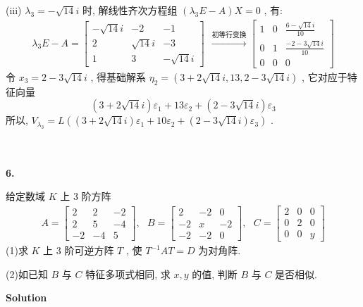 \documentclass[11pt,a4paper,openany,oneside]{book}
\newcommand\Solution{\noindent\textbf{\textsf{Solution}}\par\medskip}
\begin{document}
(iii) $ \lambda_3=-\sqrt{14}i $ 时, 解线性齐次方程组 $ (\lambda_3E -A)X=0 $ , 有:
\begin{gather*}
\lambda_3E-A=
\begin{bmatrix}
-\sqrt{14}i  &  -2  &  -1  \\
2  &  \sqrt{14}i  &  -3  \\
1  &  3  &  -\sqrt{14}i
\end{bmatrix} \ \ \xrightarrow{初等行变换}
\begin{bmatrix}
1  &  0  &   \frac{6-\sqrt{14}i}{10} \\
0  &  1  &   \frac{-2-3\sqrt{14}i}{10} \\
0  &  0  &  0  
\end{bmatrix}
\end{gather*}
令 $ x_3 =2-3\sqrt{14}i $ , 得基础解系 $ \eta_2 = (3+2\sqrt{14}i,13, 2 - 3\sqrt{14}i) $ , 它对应于特征向量
 $$ (3+2\sqrt{14}i)\varepsilon_1 + 13\varepsilon_2 +( 2 -3\sqrt{14}i)\varepsilon_3 $$ 
所以,  $ V_{\lambda_3} = L((3+2\sqrt{14}i)\varepsilon_1 + 10\varepsilon_2 +( 2 -3\sqrt{14}i)\varepsilon_3) $ . \\  \\  \\




\begin{myexample}
	\textbf{6.}

给定数域 $ K $ 上 $ 3 $ 阶方阵
\begin{gather*}
A=
\begin{bmatrix}
2  &  2  &  -2  \\
2  &  5  &  -4 \\
-2  &  -4  &  5
\end{bmatrix}, \ \ \ 
B=
\begin{bmatrix}
2  &  -2  &  0  \\
-2  &  x  &  -2  \\
-2  &  -2  &  0
\end{bmatrix}, \ \ \ 
C=
\begin{bmatrix}
2  &  0  &  0  \\
0  &  2  &  0  \\
0  &  0  &  y
\end{bmatrix}
\end{gather*}
(1)求 $ K $ 上 $ 3 $ 阶可逆方阵 $ T $ , 使 $ T^{-1}AT=D $ 为对角阵. 

(2)如已知 $ B $ 与 $ C $ 特征多项式相同, 求 $ x, y $ 的值, 判断 $ B $ 与 $ C $ 是否相似. \\

\end{myexample}
\Solution 
\end{document}
